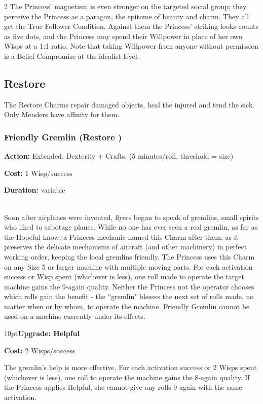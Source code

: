 \begin{multicols}{2}
The Princess' magnetism is even stronger on the targeted social group; they perceive the Princess as a paragon, the epitome of beauty and charm. They all get the True Follower Condition. Against them the Princess' striking looks counts as five dots, and the Princess may spend their Willpower in place of her own Wisps at a 1:1 ratio. Note that taking Willpower from anyone without permission is a Belief Compromise at the idealist level.

\subsection*{Restore}
\label{subsec:Restore}
The Restore Charms repair damaged objects, heal the injured and tend the sick. Only Menders have affinity for them.
\subsubsection*{Friendly Gremlin (Restore \textbullet)}

\noindent \textbf{Action:} Extended, Dexterity + Crafts, (5 minutes/roll, threshold = size)

\noindent \textbf{Cost:} 1 Wisp/success

\noindent \textbf{Duration:} variable \\\

\noindent Soon after airplanes were invented, flyers began to speak of gremlins, small spirits who liked to sabotage planes. While no one has ever seen a real gremlin, as far as the Hopeful know, a Princess-mechanic named this Charm after them, as it preserves the delicate mechanisms of aircraft (and other machinery) in perfect working order, keeping the local gremlins friendly. The Princess uses this Charm on any Size 5 or larger machine with multiple moving parts. For each activation success or Wisp spent (whichever is less), one roll made to operate the target machine gains the 9-again quality. Neither the Princess not the operator chooses which rolls gain the benefit - the \textquotedblleft gremlin" blesses the next set of rolls made, no matter when or by whom, to operate the machine. Friendly Gremlin cannot be used on a machine currently under its effects.

\begin{myindentpar}{10pt}\textbf{Upgrade: Helpful}

\noindent \textbf{Cost:} 2 Wisps/success

The gremlin's help is more effective. For each activation success or 2 Wisps spent (whichever is less), one roll to operate the machine gains the 8-again quality. If the Princess applies Helpful, she cannot give any rolls 9-again with the same activation.


\end{myindentpar}
\end{multicols}
